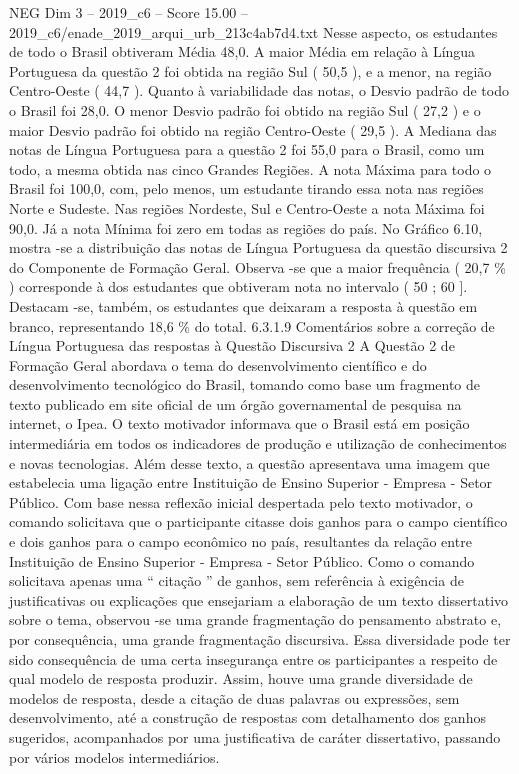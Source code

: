 \begin{textsample}{NEG Dim 3 – 2019\_c6 – Score 15.00 – 2019\_c6/enade\_2019\_arqui\_urb\_213c4ab7d4.txt}
Nesse aspecto, os estudantes de todo o Brasil obtiveram Média 48,0.
A maior Média em relação à Língua Portuguesa da questão 2 foi obtida na região Sul ( 50,5 ), e a menor, na região Centro-Oeste ( 44,7 ).
Quanto à variabilidade das notas, o Desvio padrão de todo o Brasil foi 28,0.
O menor Desvio padrão foi obtido na região Sul ( 27,2 ) e o maior Desvio padrão foi obtido na região Centro-Oeste ( 29,5 ).
A Mediana das notas de Língua Portuguesa para a questão 2 foi 55,0 para o Brasil, como um todo, a mesma obtida nas cinco Grandes Regiões.
A nota Máxima para todo o Brasil foi 100,0, com, pelo menos, um estudante tirando essa nota nas regiões Norte e Sudeste.
Nas regiões Nordeste, Sul e Centro-Oeste a nota Máxima foi 90,0.
Já a nota Mínima foi zero em todas as regiões do país.
No Gráfico 6.10, mostra -se a distribuição das notas de Língua Portuguesa da questão discursiva 2 do Componente de Formação Geral.
Observa -se que a maior frequência ( 20,7 \% ) corresponde à dos estudantes que obtiveram nota no intervalo ( 50 ; 60 ].
Destacam -se, também, os estudantes que deixaram a resposta à questão em branco, representando 18,6 \% do total. 6.3.1.9 Comentários sobre a correção de Língua Portuguesa das respostas à Questão Discursiva 2 A Questão 2 de Formação Geral abordava o tema do desenvolvimento científico e do desenvolvimento tecnológico do Brasil, tomando como base um fragmento de texto publicado em site oficial de um órgão governamental de pesquisa na internet, o Ipea.
O texto motivador informava que o Brasil está em posição intermediária em todos os indicadores de produção e utilização de conhecimentos e novas tecnologias.
Além desse texto, a questão apresentava uma imagem que estabelecia uma ligação entre Instituição de Ensino Superior - Empresa - Setor Público.
Com base nessa reflexão inicial despertada pelo texto motivador, o comando solicitava que o participante citasse dois ganhos para o campo científico e dois ganhos para o campo econômico no país, resultantes da relação entre Instituição de Ensino Superior - Empresa - Setor Público.
Como o comando solicitava apenas uma “ citação ” de ganhos, sem referência à exigência de justificativas ou explicações que ensejariam a elaboração de um texto dissertativo sobre o tema, observou -se uma grande fragmentação do pensamento abstrato e, por consequência, uma grande fragmentação discursiva.
Essa diversidade pode ter sido consequência de uma certa insegurança entre os participantes a respeito de qual modelo de resposta produzir.
Assim, houve uma grande diversidade de modelos de resposta, desde a citação de duas palavras ou expressões, sem desenvolvimento, até a construção de respostas com detalhamento dos ganhos sugeridos, acompanhados por uma justificativa de caráter dissertativo, passando por vários modelos intermediários.

\end{textsample}
